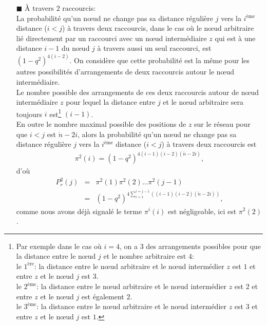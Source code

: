 \begin{itemize}
\item[$\blacksquare$]  \`{A} travers $2$ raccourcis: \\
La probabilité qu'un nœud ne change pas sa distance régulière $j$ vers la $i^{\text{ème}}$ distance ($i<j$) à travers deux raccourcis, dans
le cas où le nœud arbitraire lié directement par un raccourci avec un nœud intermédiaire $z$ qui est à une distance $i-1$ du
nœud $j$ à travers aussi un seul raccourci, est $(1-q^2)^{4(i-2)}$. On considère que cette probabilité est la m\^{e}me
pour les autres possibilités d'arrangements de deux  raccourcis autour le nœud intermédiaire.\\ Le nombre
possible des arrangements de ces deux raccourcis autour de nœud intermédiaire $z$ pour lequel la distance entre $j$ et le nœud arbitraire sera toujours $i$ est\footnote{Par exemple dans le cas où $i=4$, on a $3$ des arrangements possibles pour que la distance entre le nœud $j$ et le nombre arbitraire est $4$:\\ le $1^{\text{ère}}$: la distance entre le nœud arbitraire et le nœud intermédier $z$ est $1$ et entre $z$ et le nœud $j$ est $3$.\\ le $2^{\text{ème}}$: la distance entre le nœud arbitraire et le nœud intermédier $z$ est $2$ et entre $z$ et le nœud $j$ est également $2$.\\ le $3^{\text{ème}}$: la distance entre le nœud arbitraire et le nœud intermédier $z$ est $3$ et entre $z$ et le nœud $j$ est $1$.}  $(i-1)$.\\
En outre le nombre maximal possible des positions de $z$ sur le réseau pour que $i<j$ est
$\acute{n}-2i$, alors la probabilité qu'un nœud ne change pas sa distance régulière $j$ vers
la $i^{\text{ème}}$ distance ($i<j$) à travers deux raccourcis est
\begin{eqnarray}
	\pi^2(i)=(1-q^2)^{4(i-1)(i-2)(\acute{n}-2i)},\nonumber
\end{eqnarray}
d'où
\begin{eqnarray}
	P_r^2(j)&=&\pi^2(1)\pi^2(2)...\pi^2(j-1)\\\nonumber
	&=& (1-q^2)^{4\sum_{i=1}^{i=j-1}((i-1)(i-2)(\acute{n}-2i))},
\end{eqnarray}
comme nous avons déjà signalé le terme $\pi^i(i)$ est négligeable, ici est $\pi^2(2)$.\\
	

\end{itemize}
